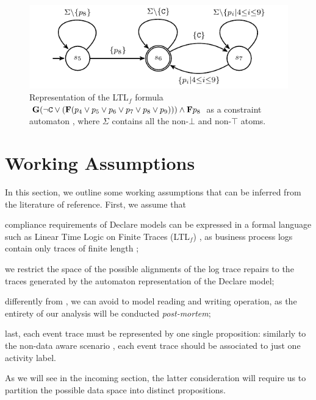 \begin{figure}[!t]
	\centering
%
\includegraphics[scale=0.9]{images/example_3_graph}
	\caption{Representation of the LTL$_f$ formula $\mathbf{G}(\neg\texttt{C}\vee(\mathbf{F}(p_4\vee p_5\vee p_6\vee p_7\vee p_8\vee p_9)))\wedge \mathbf{F} p_8$  as a constraint automaton \cite{Westergaard11}, where $\Sigma$ contains all the non-$\bot$ and non-$\top$ atoms.}
	\label{fig:g1g2}
\end{figure}

\section{Working Assumptions}\label{sec:wa}

In this section, we outline some working assumptions that can be inferred from the literature of reference. First, we assume that \begin{enumerate*}[label=\emph{\alph*})]
\item compliance requirements of Declare models can be expressed in a formal language such as Linear Time Logic on Finite Traces (LTL$_f$) \cite{10.1007/978-3-642-40176-3_8}, as business process logs contain only traces of finite length \cite{GiacomoV13};
\item we restrict the space of the possible alignments of the log trace repairs to the traces generated by the automaton representation of the Declare model;
\item differently from \cite{MultiPerspective}, we can avoid to model reading and writing operation, as the entirety of our analysis will be conducted \textit{post-mortem}; \item last, each event trace must be represented by one single proposition: similarly to the non-data aware scenario \cite{XuLZ17a}, each event trace should be associated to just one activity label. \end{enumerate*} As we will see in the incoming section, the latter consideration will require us to partition the possible data space into distinct propositions.


